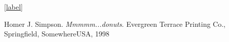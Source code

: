 \ref{label}
\begin{thebibliography}{999}

 Homer J. Simpson. \textsl{Mmmmm...donuts}. Evergreen Terrace Printing Co.,
                          Springfield, SomewhereUSA, 1998
\end{thebibliography}
